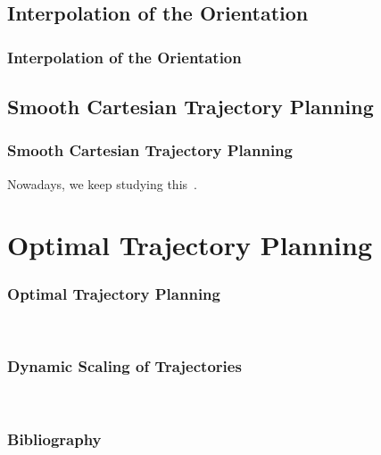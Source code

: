 \documentclass[10pt, aspectratio=169]{beamer}
\theoremstyle{remark}
\theoremstyle{definition}
\begin{document}
\subsection{Interpolation of the Orientation}
\begin{frame}[allowframebreaks]
\frametitle{Interpolation of the Orientation}


\end{frame}


\subsection{Smooth Cartesian Trajectory Planning}
\begin{frame}[allowframebreaks]
\frametitle{Smooth Cartesian Trajectory Planning}


Nowadays, we keep studying this~\cite{tagliavini2023smooth}.

\end{frame}


\section{Optimal Trajectory Planning}
\begin{frame}[allowframebreaks]
\frametitle{Optimal Trajectory Planning}

~\cite{vukobratovic1982method}

\end{frame}


\begin{frame}[allowframebreaks]
\frametitle{Dynamic Scaling of Trajectories}

~\cite{hollerbach1983dynamic}

\end{frame}




\begin{frame}[allowframebreaks]
\frametitle{Bibliography}
\printbibliography
\end{frame}
\end{document}
